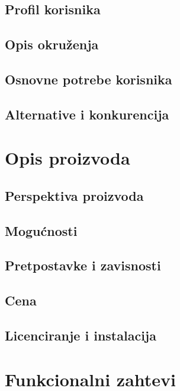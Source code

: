 \section{Profil korisnika}

\section{Opis okruženja}

\section{Osnovne potrebe korisnika}

\section{Alternative i konkurencija}




\chapter{Opis proizvoda}

\section{Perspektiva proizvoda}

\section{Mogućnosti}

\section{Pretpostavke i zavisnosti}

\section{Cena}

\section{Licenciranje i instalacija}




\chapter{Funkcionalni zahtevi}

